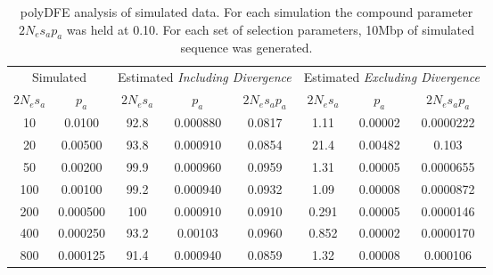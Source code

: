 

\begin{table}
\centering

\caption{polyDFE analysis of simulated data. For each simulation the compound parameter $2N_es_ap_a$ was held at 0.10. For each set of selection parameters, 10Mbp of simulated sequence was generated.}

        \begin{tabular}{cccccccc}
        \toprule
        \multicolumn{2}{c}{Simulated} & \multicolumn{3}{c}{Estimated  \textit{Including Divergence}} & \multicolumn{3}{c}{Estimated  \textit{Excluding Divergence}} \\ 
		\cmidrule(lr){3-5}\cmidrule(lr){6-8}
 $2N_es_a$ & $p_a$ &  $2N_es_a$ & $p_a$ &  $2N_es_ap_a$ &   $2N_es_a$  & $p_a$ & $2N_es_ap_a$  \\ \hline
  10 & 0.0100 & 92.8 & 0.000880 & 0.0817 & 1.11 & 0.00002 & 0.0000222 \\
 20 & 0.00500 & 93.8 & 0.000910 & 0.0854 & 21.4 & 0.00482 & 0.103 \\
 50 & 0.00200 & 99.9 & 0.000960 & 0.0959 & 1.31 & 0.00005 & 0.0000655 \\
 100 & 0.00100 & 99.2 & 0.000940 & 0.0932 & 1.09 & 0.00008 & 0.0000872 \\
 200 & 0.000500 & 100 & 0.000910 & 0.0910 & 0.291 & 0.00005 & 0.0000146 \\
 400 & 0.000250 & 93.2 & 0.00103 & 0.0960 & 0.852 & 0.00002 & 0.0000170\\
 800 & 0.000125 & 91.4 & 0.000940 & 0.0859 & 1.32 & 0.00008 & 0.000106 \\
\bottomrule
\end{tabular}    

   \label{tab:polyDFE}

\end{table}

